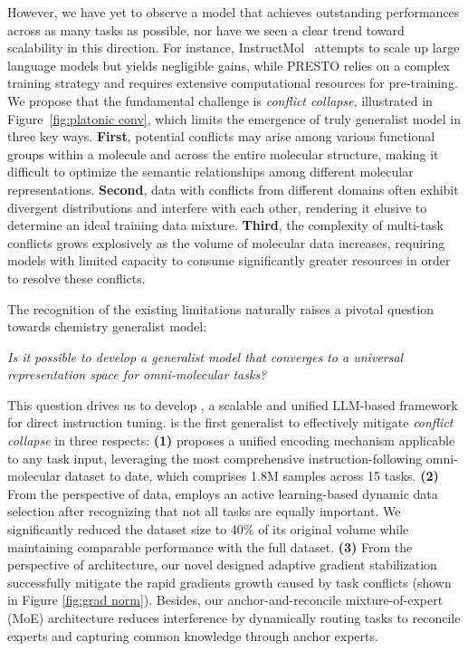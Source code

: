 However, we have yet to observe a model that achieves outstanding performances across as many tasks as possible, nor have we seen a clear trend toward scalability in this direction. For instance, InstructMol~\cite{cao2023instructmol} attempts to scale up large language models but yields negligible gains, while PRESTO relies on a complex training strategy and requires extensive computational resources for pre-training.
We propose that the fundamental challenge is \textit{conflict collapse}, illustrated in Figure~\ref{fig:platonic conv}, which limits the emergence of truly generalist model in three key ways. \textbf{First}, potential conflicts may arise among various functional groups within a molecule and across the entire molecular structure, making it difficult to optimize the semantic relationships among different molecular representations.  
\textbf{Second}, data with conflicts from different domains often exhibit divergent distributions and interfere with each other, rendering it elusive to determine an ideal training data mixture.  
\textbf{Third}, the complexity of multi-task conflicts grows explosively as the volume of molecular data increases, requiring models with limited capacity to consume significantly greater resources in order to resolve these conflicts.

The recognition of the existing limitations naturally raises a pivotal question towards chemistry generalist model:
\begin{tcolorbox}[notitle, rounded corners, colframe=darkgrey, colback=white, boxrule=1.5pt, boxsep=0pt, left=0.15cm, right=0.17cm, enhanced, shadow={2.5pt}{-2.5pt}{1.5pt}{opacity=5},toprule=2pt, before skip=0.65em, after skip=0.75em 
  ]
\emph{
  {
    \centering 
  {
    \fontsize{8.5pt}{13.2pt}\selectfont 
    Is it possible to develop a generalist model that converges to a universal representation space for omni-molecular tasks?
  }
  \\
  }
  }
\end{tcolorbox}

This question drives us to develop \method, a scalable and unified LLM-based framework for direct instruction tuning. \method is the first generalist to effectively mitigate \textit{conflict collapse} in three respects:
\textbf{(1)} \method proposes a unified encoding mechanism applicable to any task input, leveraging the most comprehensive instruction-following omni-molecular dataset to date, which comprises 1.8M samples across 15 tasks.
\textbf{(2)} From the perspective of data, \method employs an active learning-based dynamic data selection after recognizing that not all tasks are equally important. We significantly reduced the dataset size to 40\% of its original volume while maintaining comparable performance with the full dataset.
\textbf{(3)} From the perspective of architecture, our novel designed adaptive gradient stabilization successfully mitigate the rapid gradients growth caused by task conflicts (shown in Figure \ref{fig:grad norm}). Besides, our anchor-and-reconcile mixture-of-expert (MoE) architecture reduces interference by dynamically routing tasks to reconcile experts and capturing common knowledge through anchor experts.

